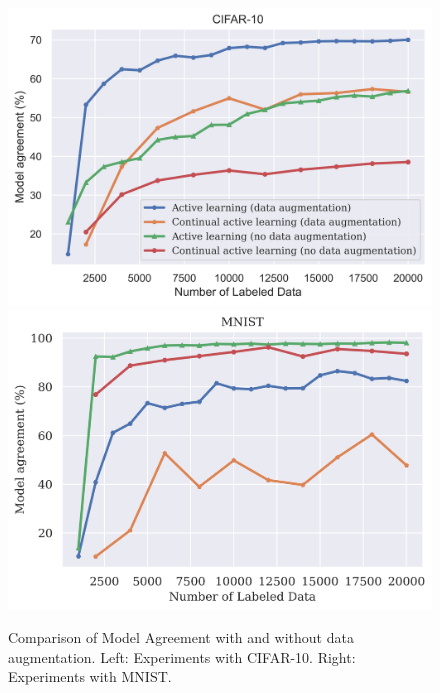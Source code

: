 \begin{figure}[h]
    \centering
    \includegraphics[width=0.48\linewidth]{images/results_CALMS/data_augmentation_cifar.png} \hfill
    \includegraphics[width=0.48\linewidth]{images/results_CALMS/data_augmentation_mnist.png}
    \caption{Comparison of Model Agreement with and without data augmentation. Left: Experiments with CIFAR-10. Right: Experiments with MNIST.}
    \label{fig:Evaluation:Results:CAL:EffectAugmentation}
\end{figure}

